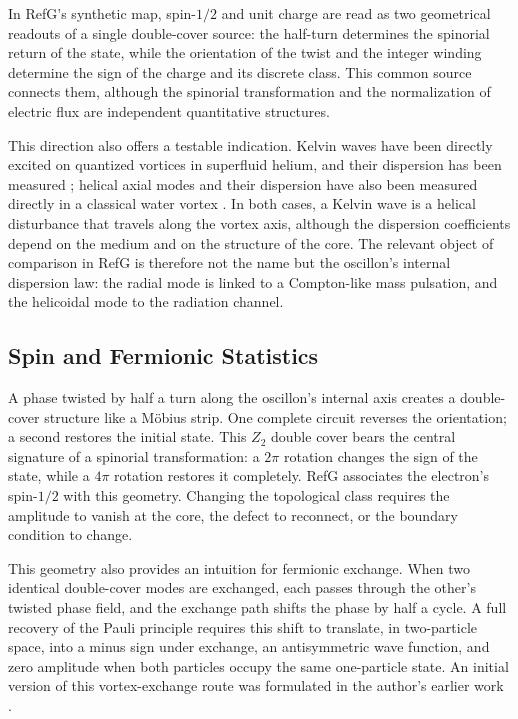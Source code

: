 \documentclass[11pt,a4paper]{article}
\begin{document}
In RefG's synthetic map, spin-$1/2$ and unit charge are read as two geometrical readouts of a single double-cover source: the half-turn determines the spinorial return of the state, while the orientation of the twist and the integer winding determine the sign of the charge and its discrete class. This common source connects them, although the spinorial transformation and the normalization of electric flux are independent quantitative structures.

This direction also offers a testable indication. Kelvin waves have been directly excited on quantized vortices in superfluid helium, and their dispersion has been measured \citep{minowa2025}; helical axial modes and their dispersion have also been measured directly in a classical water vortex \citep{barckicke2026}. In both cases, a Kelvin wave is a helical disturbance that travels along the vortex axis, although the dispersion coefficients depend on the medium and on the structure of the core. The relevant object of comparison in RefG is therefore not the name but the oscillon's internal dispersion law: the radial mode is linked to a Compton-like mass pulsation, and the helicoidal mode to the radiation channel.

\subsection{Spin and Fermionic Statistics}

A phase twisted by half a turn along the oscillon's internal axis creates a double-cover structure like a Möbius strip. One complete circuit reverses the orientation; a second restores the initial state. This $Z_2$ double cover bears the central signature of a spinorial transformation: a $2\pi$ rotation changes the sign of the state, while a $4\pi$ rotation restores it completely. RefG associates the electron's spin-$1/2$ with this geometry. Changing the topological class requires the amplitude to vanish at the core, the defect to reconnect, or the boundary condition to change.

This geometry also provides an intuition for fermionic exchange. When two identical double-cover modes are exchanged, each passes through the other's twisted phase field, and the exchange path shifts the phase by half a cycle. A full recovery of the Pauli principle requires this shift to translate, in two-particle space, into a minus sign under exchange, an antisymmetric wave function, and zero amplitude when both particles occupy the same one-particle state. An initial version of this vortex-exchange route was formulated in the author's earlier work \citep{lotishvili2026b}.
\end{document}
